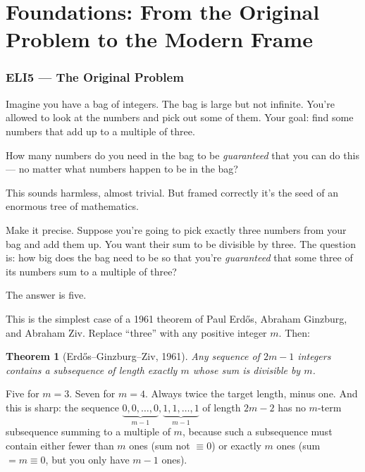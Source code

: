 \documentclass[11pt,a4paper]{article}
\theoremstyle{plain}
\newtheorem{theorem}{Theorem}[section]
\theoremstyle{definition}
\theoremstyle{remark}
\begin{document}
\newpage

\part{Foundations: From the Original Problem to the Modern Frame}

\section{ELI5 --- The Original Problem}\label{sec:eli5}

Imagine you have a bag of integers. The bag is large but not infinite. You're allowed to look at the numbers and pick out some of them. Your goal: find some numbers that add up to a multiple of three.

How many numbers do you need in the bag to be \emph{guaranteed} that you can do this --- no matter what numbers happen to be in the bag?

This sounds harmless, almost trivial. But framed correctly it's the seed of an enormous tree of mathematics.

Make it precise. Suppose you're going to pick exactly three numbers from your bag and add them up. You want their sum to be divisible by three. The question is: how big does the bag need to be so that you're \emph{guaranteed} that some three of its numbers sum to a multiple of three?

The answer is five.

This is the simplest case of a 1961 theorem of Paul Erd\H{o}s, Abraham Ginzburg, and Abraham Ziv. Replace ``three'' with any positive integer $m$. Then:

\begin{theorem}[Erd\H{o}s--Ginzburg--Ziv, 1961]
\label{thm:egz-classical}
Any sequence of $2m-1$ integers contains a subsequence of length exactly $m$ whose sum is divisible by $m$.
\end{theorem}

Five for $m = 3$. Seven for $m = 4$. Always twice the target length, minus one. And this is sharp: the sequence $\underbrace{0, 0, \ldots, 0}_{m-1}, \underbrace{1, 1, \ldots, 1}_{m-1}$ of length $2m - 2$ has no $m$-term subsequence summing to a multiple of $m$, because such a subsequence must contain either fewer than $m$ ones (sum not $\equiv 0$) or exactly $m$ ones (sum $= m \equiv 0$, but you only have $m-1$ ones).
\end{document}
